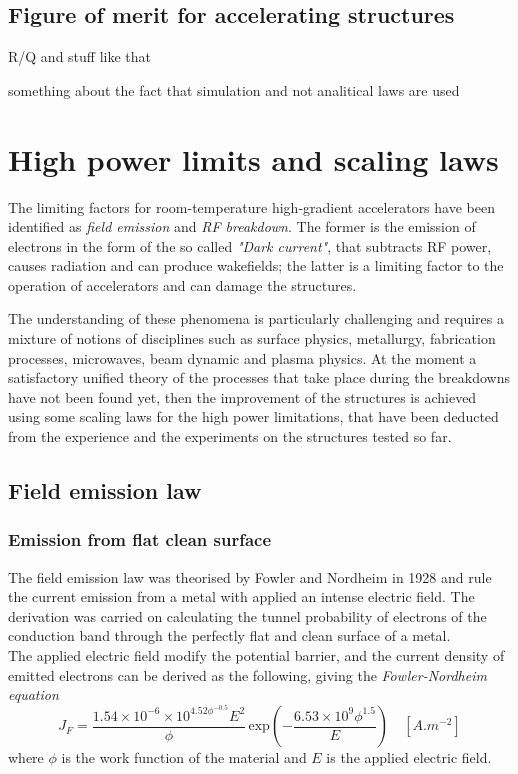 \subsection[Figure of merit for accelerating structures]{Figure of merit for accelerating structures}

R/Q and stuff like that

something about the fact that simulation and not analitical laws are used


\section[High power limits and scaling laws]{High power limits and scaling laws}

The limiting factors for room-temperature high-gradient accelerators have been identified as \textit{field emission} and \textit{RF breakdown}. The former is the emission of electrons in the form of the so called \textit{"Dark current"}, that subtracts RF power, causes radiation and can produce wakefields; the latter is a limiting factor to the operation of accelerators and can damage the structures.\cite{Wang:1997ip}

The understanding of these phenomena is particularly challenging and requires a mixture of notions of disciplines such as surface physics, metallurgy, fabrication processes, microwaves, beam dynamic and plasma physics. At the moment a satisfactory unified theory of the processes that take place during the breakdowns have not been found yet, then the improvement of the structures is achieved using some scaling laws for the high power limitations, that have been deducted from the experience and the experiments on the structures tested so far. 


\subsection[Field emission law]{Field emission law}

\subsubsection{Emission from flat clean surface}

The field emission law was theorised by Fowler and Nordheim in 1928 and rule the current emission from a metal with applied an intense electric field. The derivation was carried on calculating the tunnel probability of electrons of the conduction band through the perfectly flat and clean surface of a metal. \\The applied electric field modify the potential barrier, and the current density of emitted electrons can be derived as the following, giving the  \textit{Fowler-Nordheim equation} \cite{Fowler173}
\begin{equation}
J_F = \frac{ 1.54\times10^{-6} \times 10^{4.52\phi^{-0.5}} E^2}{  \phi } \, \text{exp} \left ( -\frac{6.53\times 10^9 \phi^{1.5}}{E} \right ) \quad [A.m^{-2}]  \label{FNlaw}
\end{equation}
where $\phi$ is the work function of the material and $E$ is the applied electric field.

